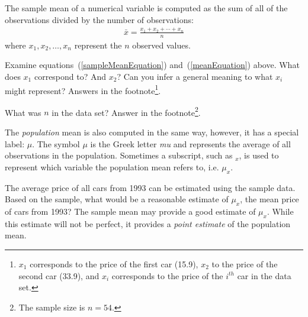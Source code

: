 \begin{termBox}{
The sample mean of a numerical variable is computed as the sum of all of the observations divided by the number of observations:
\begin{eqnarray}
\bar{x} = \frac{x_1+x_2+\cdots+x_n}{n}
\label{meanEquation}
\end{eqnarray}
where $x_1, x_2, \dots, x_n$ represent the $n$ observed values.}
\end{termBox}\vspace{-2mm}

\begin{exercise}
Examine equations~(\ref{sampleMeanEquation}) and~(\ref{meanEquation}) above. What does $x_1$ correspond to? And $x_2$? Can you infer a general meaning to what $x_i$ might represent? Answers in the footnote\footnote{$x_1$ corresponds to the price of the first car (15.9), $x_2$ to the price of the second car (33.9), and $x_i$ corresponds to the price of the $i^{th}$ car in the data set.}.
\end{exercise}

\begin{exercise}
What was $n$ in the  data set? Answer in the footnote\footnote{The sample size is $n=54$.}.
\end{exercise}

The \emph{population} mean is also computed in the same way, however, it has a special label: $\mu$. The symbol $\mu$ is the Greek letter \emph{mu} and represents the average of all observations in the population. Sometimes a subscript, such as $_x$, is used to represent which variable the population mean refers to, i.e. $\mu_x$.

\begin{example}{The average price of all cars from 1993 can be estimated using the sample data. Based on the  sample, what would be a reasonable estimate of $\mu_x$, the mean price of cars from 1993?}
The sample mean may provide a good estimate of $\mu_x$. While this estimate will not be perfect, it provides a \emph{point estimate} of the population mean.
\end{example}

